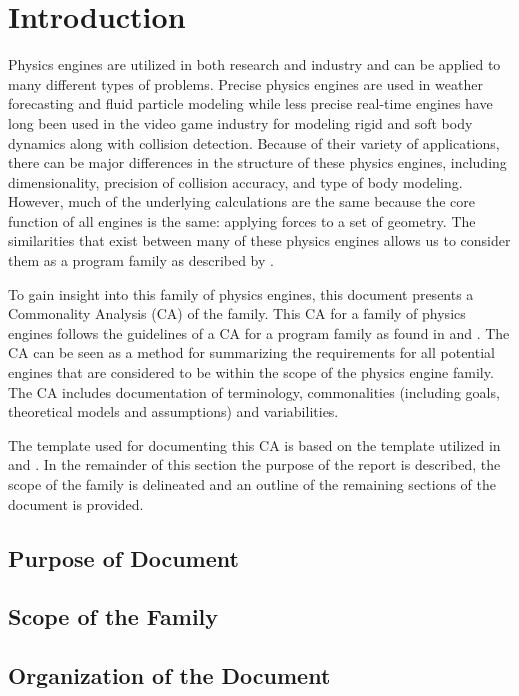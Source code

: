 \documentclass{article}
\begin{document}
\newpage

\section{Introduction}
Physics engines are utilized in both research and industry and can be applied to many different types of problems. Precise physics engines are used in weather forecasting and fluid particle modeling while less precise real-time engines have long been used in the video game industry for modeling rigid and soft body dynamics along with collision detection. Because of their variety of applications, there can be major differences in the structure of these physics engines, including dimensionality, precision of collision accuracy, and type of body modeling. However, much of the underlying calculations are the same because the core function of all engines is the same: applying forces to a set of geometry. The similarities that exist between many of these physics engines allows us to consider them as a program family as described by \cite{SCFamilies}.
\par
To gain insight into this family of physics engines, this document presents
a Commonality Analysis (CA) of the family. This CA for a family of physics engines follows the guidelines of a CA for a program family as found in \cite{FASTDomain} and \cite{SoftwarePL}. The CA can be seen as a method for
summarizing the requirements for all potential engines that are considered to be within the scope of the physics engine family. The CA includes documentation of terminology, commonalities (including goals, theoretical models and assumptions) and variabilities.
\par
The template used for documenting this CA is based on the template utilized in \cite{MaterialsCA} and \cite{MeshCA}. In the remainder of this section the purpose of the report is described, the scope of the family is delineated and an outline of the remaining sections of the document is provided.

\subsection{Purpose of Document}


\subsection{Scope of the Family} \label{Sec_Scope}

 
\subsection{Organization of the Document}
\end{document}
